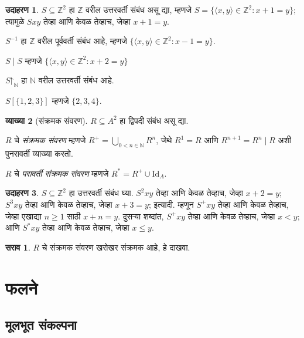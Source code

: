 \documentclass[11pt,a4paper,openany]{book}
\theoremstyle{definition}
\newtheorem{defn}{व्याख्या}[section]
\newtheorem{ex}[defn]{उदाहरण}
\newtheorem{prob}{सराव}[chapter]
\newcommand{\Setabs}[2]{\{#1:#2\}}
\newcommand{\tuple}[1]{\langle #1\rangle}
\newcommand{\Nat}{\mathbb{N}}
\newcommand{\Int}{\mathbb{Z}}
\newcommand{\Id}[1]{\mathord{\mathrm{Id}_{#1}}}
\newcommand{\funrestrictionto}[2]{#1\mathord{\restriction}_{#2}}
\newcommand{\funimage}[2]{#1[#2]}
\begin{document}
\begin{ex}
$S \subseteq \Int^2$ हा $\Int$ वरील उत्तरवर्ती संबंध असू द्या, म्हणजे
$S = \Setabs{\tuple{x, y} \in \Int^2}{x + 1 = y}$; त्यामुळे $Sxy$
तेव्हा आणि केवळ तेव्हाच, जेव्हा $x + 1 = y$.

$S^{-1}$ हा $\Int$ वरील पूर्ववर्ती संबंध आहे, म्हणजे
$\Setabs{\tuple{x,y}\in\Int^2}{x -1 =y}$.

$S\mid S$ म्हणजे
$ \Setabs{\tuple{x,y}\in\Int^2}{x + 2 =y}$

$\funrestrictionto{S}{\Nat}$ हा $\Nat$ वरील उत्तरवर्ती संबंध आहे.

$\funimage{S}{\{1,2,3\}}$ म्हणजे $\{2, 3, 4\}$.
\end{ex}

\begin{defn}[संक्रमक संवरण] $R \subseteq A^2$ हा द्विपदी संबंध असू द्या.

$R$ चे \emph{संक्रमक संवरण} म्हणजे $R^+ = \bigcup_{0 < n \in
\Nat} R^n$, जेथे $R^1 = R$ आणि $R^{n+1} = R^n \mid R$ अशी पुनरावर्ती
व्याख्या करतो.

$R$ चे \emph{परावर्ती संक्रमक संवरण} म्हणजे $R^* = R^+ \cup \Id{A}$.
\end{defn}

\begin{ex}
$S \subseteq \Int^2$ हा उत्तरवर्ती संबंध घ्या. $S^2xy$ तेव्हा आणि केवळ
तेव्हाच, जेव्हा $x + 2 = y$; $S^3xy$ तेव्हा आणि केवळ तेव्हाच, जेव्हा
$x + 3 = y$; इत्यादी. म्हणून $S^+xy$ तेव्हा आणि केवळ तेव्हाच, जेव्हा
एखाद्या $n \geq 1$ साठी $x + n = y$. दुसऱ्या शब्दांत, $S^+xy$ तेव्हा
आणि केवळ तेव्हाच, जेव्हा $x < y$; आणि $S^*xy$ तेव्हा आणि केवळ तेव्हाच,
जेव्हा $x \le y$.
\end{ex}

\begin{prob}
$R$ चे संक्रमक संवरण खरोखर संक्रमक आहे, हे दाखवा.
\end{prob}


\chapter{फलने}\label{sfr:fun::chap}





\section{मूलभूत संकल्पना}\label{sfr:fun:bas:sec}
\end{document}
